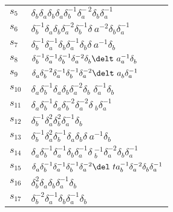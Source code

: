 \documentclass{article}
\begin{document}
\begin{center}
\begin{tabular}{ll}
$s_{5}$ & $\delta_b^{}\delta_a^{}\delta_b^{}\delta_a^{}\delta_b^{-1}\delta_a^{-\
2}\delta_b^{}\delta_a^{-1}$ \\
$s_{6}$ & $\delta_b^{-1}\delta_a^{}\delta_b^{}\delta_a^{-2}\delta_b^{-1}\delta_\
a^{-2}\delta_b^{}\delta_a^{-1}$ \\
$s_{7}$ & $\delta_b^{-1}\delta_a^{-1}\delta_b^{}\delta_a^{-1}\delta_b^{}\delta_\
a^{-1}\delta_b^{}$ \\
$s_{8}$ & $\delta_b^{-1}\delta_a^{-1}\delta_b^{-1}\delta_a^{-2}\delta_b^{}\delt\
a_a^{-1}\delta_b^{}$ \\
$s_{9}$ & $\delta_a^{}\delta_b^{-2}\delta_a^{-1}\delta_b^{-1}\delta_a^{-2}\delt\
a_b^{}\delta_a^{-1}$ \\
$s_{10}$ & $\delta_a^{}\delta_b^{-1}\delta_a^{}\delta_b^{}\delta_a^{-2}\delta_b\
^{}\delta_a^{-1}\delta_b^{}$ \\
$s_{11}$ & $\delta_a^{}\delta_b^{-1}\delta_a^{}\delta_b^{-2}\delta_a^{-2}\delta\
_b^{}\delta_a^{-1}$ \\
$s_{12}$ & $\delta_b^{-1}\delta_a^{2}\delta_b^{2}\delta_a^{-1}\delta_b^{}$ \\
$s_{13}$ & $\delta_b^{-1}\delta_a^{2}\delta_b^{-1}\delta_a^{}\delta_b^{}\delta_\
a^{-1}\delta_b^{}$ \\
$s_{14}$ & $\delta_a^{}\delta_b^{-1}\delta_a^{-1}\delta_b^{}\delta_a^{-1}\delta\
_b^{-1}\delta_a^{-2}\delta_b^{}\delta_a^{-1}$ \\
$s_{15}$ & $\delta_a^{}\delta_b^{-1}\delta_a^{-1}\delta_b^{-1}\delta_a^{-2}\del\
ta_b^{-1}\delta_a^{-2}\delta_b^{}\delta_a^{-1}$ \\
$s_{16}$ & $\delta_b^{2}\delta_a^{}\delta_b^{}\delta_a^{-1}\delta_b^{}$ \\
$s_{17}$ & $\delta_b^{-2}\delta_a^{-1}\delta_b^{}\delta_a^{-1}\delta_b^{}$ \\
\bottomrule
\end{tabular}
\end{center}

\thispagestyle{empty}
\end{document}
